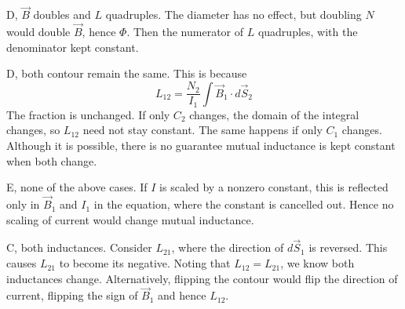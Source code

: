\documentclass[answers]{exam}
\begin{document}
\begin{questions}
\begin{solution}
    D, $\vec B$ doubles and $L$ quadruples. The diameter has no effect, but doubling $N$ would double $\vec B$, hence $\Phi$. Then the numerator of $L$ quadruples, with the denominator kept constant.
\end{solution}


\begin{solution}
    D, both contour remain the same. This is because
    $$L_{12} = \frac{N_2}{I_1} \int \vec B_1 \cdot d\vec S_2$$
    The fraction is unchanged. If only $C_2$ changes, the domain of the integral changes, so $L_{12}$ need not stay constant. The same happens if only $C_1$ changes. Although it is possible, there is no guarantee mutual inductance is kept constant when both change.
\end{solution}


\begin{solution}
    E, none of the above cases. If $I$ is scaled by a nonzero constant, this is reflected only in $\vec B_1$ and $I_1$ in the equation, where the constant is cancelled out. Hence no scaling of current would change mutual inductance.
\end{solution}


\begin{solution}
    C, both inductances. Consider $L_{21}$, where the direction of $d\vec S_1$ is reversed. This causes $L_{21}$ to become its negative. Noting that $L_{12}=L_{21}$, we know both inductances change. Alternatively, flipping the contour would flip the direction of current, flipping the sign of $\vec B_1$ and hence $L_{12}$.
\end{solution}



\end{questions}
\end{document}
